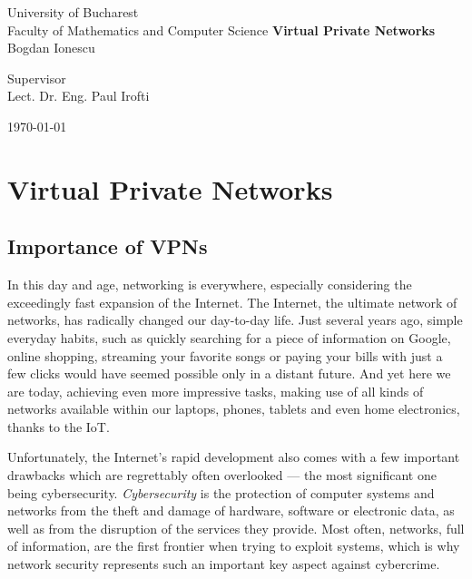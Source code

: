 \documentclass[a4paper,12pt]{report}
\begin{document}
	\begin{titlepage}
		\begin{center}
			\vspace{-10in}
			{\LARGE University of Bucharest \\
			Faculty of Mathematics and Computer Science }
			\vfill
			\textbf{\huge Virtual Private Networks} \\
			\vspace{5mm}
			{\Large Bogdan Ionescu} \\
			\vspace{20mm}
			\begin{flushleft}{\large Supervisor \\
			Lect. Dr. Eng. Paul Irofti}
			\end{flushleft}
			\vfill
			\today
		\restoregeometry
		\end{center}
	\end{titlepage}
	\author{Bogdan Ionescu}
	\date{\today}
	\tableofcontents
	
	\setlength{\glsdescwidth}{\hsize}
	\glsaddall
	\printglossary[type=\acronymtype,nonumberlist,style=long]
	
	\chapter{Virtual Private Networks}
	\section{Importance of VPNs}
		
	In this day and age, networking is everywhere, especially considering the exceedingly fast expansion of the Internet. The Internet, the ultimate network of networks, has radically changed our day-to-day life. Just several years ago, simple everyday habits, such as quickly searching for a piece of information on Google, online shopping, streaming your favorite songs or paying your bills with just a few clicks would have seemed possible only in a distant future. And yet here we are today, achieving even more impressive tasks, making use of all kinds of networks available within our laptops, phones, tablets and even home electronics, thanks to the IoT.
		
		Unfortunately, the Internet's rapid development also comes with a few important drawbacks which are regrettably often overlooked --- the most significant one being cybersecurity. \textit{Cybersecurity} is the protection of computer systems and networks from the theft and damage of hardware, software or electronic data, as well as from the disruption of the services they provide. Most often, networks, full of information, are the first frontier when trying to exploit systems,  which is why network security represents such an important key aspect against cybercrime.
		
\end{document}
